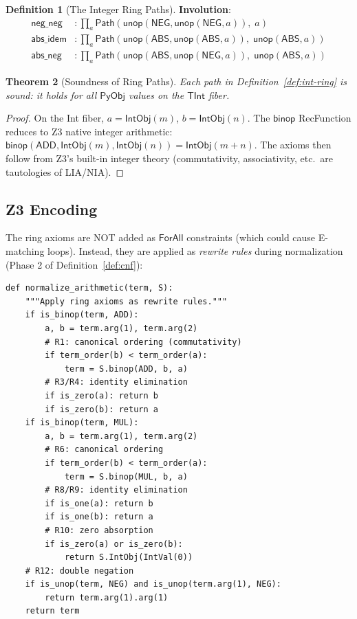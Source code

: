 \documentclass[11pt,a4paper]{report}
\theoremstyle{definition}
\newtheorem{definition}{Definition}[chapter]
\theoremstyle{plain}
\newtheorem{theorem}[definition]{Theorem}
\newcommand{\Path}{\mathsf{Path}}
\newcommand{\PyObj}{\mathsf{PyObj}}
\begin{document}
\begin{definition}[The Integer Ring Paths]
\textbf{Involution}:
\begin{align}
  \mathsf{neg\_neg} &: \prod_a
    \Path(\mathsf{unop}(\mathsf{NEG}, \mathsf{unop}(\mathsf{NEG}, a)),\; a)
    \tag{R12} \\
  \mathsf{abs\_idem} &: \prod_a
    \Path(\mathsf{unop}(\mathsf{ABS}, \mathsf{unop}(\mathsf{ABS}, a)),\;
          \mathsf{unop}(\mathsf{ABS}, a))
    \tag{R13} \\
  \mathsf{abs\_neg} &: \prod_a
    \Path(\mathsf{unop}(\mathsf{ABS}, \mathsf{unop}(\mathsf{NEG}, a)),\;
          \mathsf{unop}(\mathsf{ABS}, a))
    \tag{R14}
\end{align}
\end{definition}

\begin{theorem}[Soundness of Ring Paths]
Each path in Definition~\ref{def:int-ring} is sound: it holds for
all $\PyObj$ values on the $\mathsf{TInt}$ fiber.
\end{theorem}

\begin{proof}
On the Int fiber, $a = \mathsf{IntObj}(m)$, $b = \mathsf{IntObj}(n)$.
The $\mathsf{binop}$ RecFunction reduces to Z3 native integer
arithmetic: $\mathsf{binop}(\mathsf{ADD}, \mathsf{IntObj}(m),
\mathsf{IntObj}(n)) = \mathsf{IntObj}(m + n)$.  The axioms then
follow from Z3's built-in integer theory (commutativity, associativity,
etc.\ are tautologies of LIA/NIA).
\end{proof}

\subsection{Z3 Encoding}

The ring axioms are NOT added as $\mathsf{ForAll}$ constraints (which
could cause E-matching loops).  Instead, they are applied as
\emph{rewrite rules} during normalization (Phase 2 of
Definition~\ref{def:cnf}):

\begin{lstlisting}[caption={Ring axiom application during normalization}]
def normalize_arithmetic(term, S):
    """Apply ring axioms as rewrite rules."""
    if is_binop(term, ADD):
        a, b = term.arg(1), term.arg(2)
        # R1: canonical ordering (commutativity)
        if term_order(b) < term_order(a):
            term = S.binop(ADD, b, a)
        # R3/R4: identity elimination
        if is_zero(a): return b
        if is_zero(b): return a
    if is_binop(term, MUL):
        a, b = term.arg(1), term.arg(2)
        # R6: canonical ordering
        if term_order(b) < term_order(a):
            term = S.binop(MUL, b, a)
        # R8/R9: identity elimination
        if is_one(a): return b
        if is_one(b): return a
        # R10: zero absorption
        if is_zero(a) or is_zero(b):
            return S.IntObj(IntVal(0))
    # R12: double negation
    if is_unop(term, NEG) and is_unop(term.arg(1), NEG):
        return term.arg(1).arg(1)
    return term
\end{lstlisting}
\end{document}
